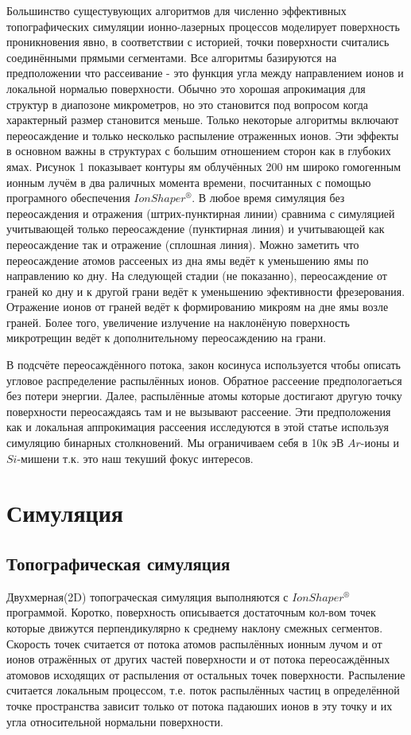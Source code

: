 \documentclass[a4paper,fontsize=12pt]{article}
\begin{document}
Большинство сущестувующих алгоритмов для численно эффективных топографических симуляции ионно-лазерных процессов моделирует поверхность проникновения явно, в соответствии с историей, точки поверхности считались соединёнными прямыми сегментами. Все алгоритмы базируются на предположении что рассеивание - это функция угла между направлением ионов и локальной нормалью поверхности. Обычно это хорошая апрокимация для структур в диапозоне микрометров, но это становится под вопросом когда характерный размер становится меньше. Только некоторые алгоритмы включают переосаждение и только несколько распыление отраженных ионов. Эти эффекты в основном важны в структурах с большим отношением сторон как в глубоких ямах. Рисунок 1 показывает контуры ям облучённых 200 нм широко гомогенным ионным лучём в два раличных момента времени, посчитанных с помощью програмного обеспечения $IonShaper^{®}$. В любое время симуляция без переосаждения и отражения (штрих-пунктирная линии) сравнима с симуляцией учитывающей только переосаждение (пунктирная линия) и учитывающей как переосаждение так и отражение (сплошная линия). Можно заметить что переосаждение атомов рассееных из дна ямы ведёт к уменьшению ямы по направлению ко дну. На следующей стадии (не показанно), переосаждение от граней ко дну и к другой грани ведёт к уменьшению эфективности фрезерования. Отражение ионов от граней ведёт к формированию микроям на дне ямы возле граней. Более того, увеличение излучение на наклонёную поверхность микротрещин ведёт к дополнительному переосаждению на грани.

В подсчёте переосаждённого потока, закон косинуса используется чтобы описать угловое распределение распылённых ионов. Обратное рассеение предпологаеться без потери энергии. Далее, распылённые атомы которые достигают другую точку поверхности переосаждаясь там и не вызывают рассеение. Эти предположения как и локальная аппрокимация рассеения исследуются в этой статье используя симуляцию бинарных столкновений. Мы ограничиваем себя в 10к эВ $Ar$-ионы и $Si$-мишени т.к. это наш текуший фокус интересов.

\section{Симуляция}
\subsection{Топографическая симуляция}

Двухмерная(2D) топограческая симуляция выполняются с $IonShaper^{®}$ программой. Коротко, поверхность описывается достаточным кол-вом точек которые движутся перпендикулярно к среднему наклону смежных сегментов. Скорость точек считается от потока атомов распылённых ионным лучом и от ионов отражённых от других частей поверхности и от потока переосаждённых атомовов исходящих от распыления от остальных точек поверхности. Распыление считается локальным процессом, т.е. поток распылённых частиц в определённой точке пространства зависит только от потока падаюших ионов в эту точку и их угла относительной нормальни поверхности.
\end{document}
